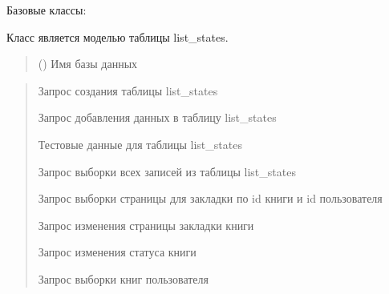 \documentclass[letterpaper,10pt,russian]{sphinxmanual}
\begin{document}
\begin{fulllineitems}
\label{\detokenize{database.sqlite3_interface.tables:database.sqlite3_interface.tables.list_states.ListStates}}
\pysigstartsignatures
{}
\pysigstopsignatures
\sphinxAtStartPar
Базовые классы: {\hyperref[\detokenize{database.sqlite3_interface.tables:database.sqlite3_interface.tables.table.Table}]{}}

\sphinxAtStartPar
Класс является моделью таблицы list\_states.
\begin{quote}\begin{description}
\sphinxAtStartPar
{} () \textendash{} Имя базы данных

\end{description}\end{quote}
\begin{description}
\begin{quote}\begin{description}
\sphinxAtStartPar
Запрос создания таблицы list\_states

\sphinxAtStartPar
Запрос добавления данных в таблицу list\_states

\sphinxAtStartPar
Тестовые данные для таблицы list\_states

\sphinxAtStartPar
Запрос выборки всех записей из таблицы list\_states

\sphinxAtStartPar
Запрос выборки страницы для закладки по id книги и id пользователя

\sphinxAtStartPar
Запрос изменения страницы закладки книги

\sphinxAtStartPar
Запрос изменения статуса книги

\sphinxAtStartPar
Запрос выборки книг пользователя


\end{description}
\end{quote}
\end{description}
\end{fulllineitems}
\end{document}
